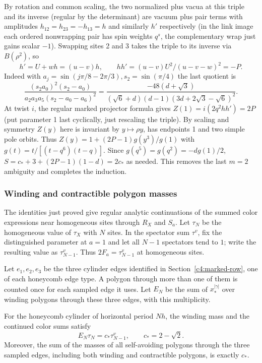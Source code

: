 By rotation and common scaling, the two normalized plus vacua at this triple and its inverse (regular by the determinant) are vacuum plus pair terms with amplitudes \(h_{12}=h_{23}=-h_{13}=h\) and similarly \(h'\) respectively (in the link image each ordered nonwrapping pair has spin weights \(q^s\), the complementary wrap just gains scalar \(-1\)). Swapping sites 2 and 3 takes the triple to its inverse via \(B(\rho^2)\), so
\[
 h'=U+wh=(u-v)h,\qquad h h'=(u-v)U^2/(u-v-w)^2=-P.
\]
Indeed with \(a_j=\sin(j\pi/8-2\pi/3), s_2=\sin(\pi/4)\) the last quotient is
\[
 \frac{(s_2 a_0)^2(s_2-a_0)}{a_2a_3a_5(s_2-a_0-a_6)^2}
 =\frac{-48(d+\sqrt3)}{(\sqrt6+d)(d-1)(3d+2\sqrt3-\sqrt6)^2}.
\]
At twist \(i\), the regular marked projector formula gives \(Z(1)=i(2q^2 hh')=2P\) (put parameter 1 last cyclically, just rescaling the triple). By scaling and symmetry \(Z(y)\) here is invariant by \(y\mapsto \rho y\), has endpoints 1 and two simple pole orbits. Thus \(Z(y)=1+(2P-1)g(y^3)/g(1)\) with \(g(t)=t/[(t-q^6)(t-q)]\). Since \(g(q^5)=g(q^2)=-d g(1)/2\), \(S=c_*+3+(2P-1)(1-d)=2c_*\) as needed. This removes the last \(m=2\) ambiguity and completes the induction.

\subsubsection{Winding and contractible polygon masses}

The identities just proved give regular analytic continuations of the
summed color expressions near homogeneous sites through $R_X$ and $S_a$.
Let $\tau_N$ be the homogeneous value of $\tau_X$ with $N$ sites. In the
spectator sum $\tau^v$, fix the distinguished parameter at $a=1$ and let
all $N-1$ spectators tend to $1$; write the resulting value as
$\tau^v_{N-1}$. Thus $2F_a=\tau^v_{N-1}$ at homogeneous sites.

Let $e_1,e_2,e_3$ be the three cylinder edges identified in
Section~\ref{c4:marked-row}, one of each honeycomb edge type. A polygon
through more than one of them is counted once for each sampled edge it
uses. Let $E_N$ be the sum of $x_*^{|\gamma|}$ over winding polygons through
these three edges, with this multiplicity.

\begin{proposition}\label{a:finite-polygons}
For the honeycomb cylinder of horizontal period $Nh$, the winding mass
and the continued color sums satisfy
\begin{equation}\label{a:finite-winding}
 E_N\tau_N=c_*\tau^v_{N-1},\qquad c_*=2-\sqrt2.
\end{equation}
Moreover, the sum of the masses of all self-avoiding polygons through the
three sampled edges, including both winding and contractible polygons,
is exactly $c_*$.
\end{proposition}

